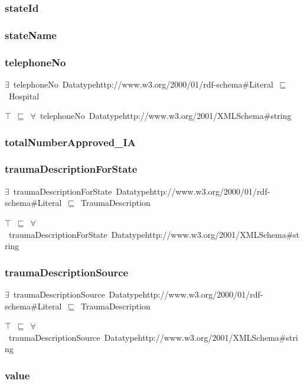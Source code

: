 \documentclass{article}
\begin{document}
\subsubsection*{stateId}

\subsubsection*{stateName}

\subsubsection*{telephoneNo}

\ensuremath{\exists}~telephoneNo~Datatypehttp://www.w3.org/2000/01/rdf-schema#Literal~\ensuremath{\sqsubseteq}~Hospital

\ensuremath{\top}~\ensuremath{\sqsubseteq}~\ensuremath{\forall}~telephoneNo~Datatypehttp://www.w3.org/2001/XMLSchema#string

\subsubsection*{totalNumberApproved\_IA}

\subsubsection*{traumaDescriptionForState}

\ensuremath{\exists}~traumaDescriptionForState~Datatypehttp://www.w3.org/2000/01/rdf-schema#Literal~\ensuremath{\sqsubseteq}~TraumaDescription

\ensuremath{\top}~\ensuremath{\sqsubseteq}~\ensuremath{\forall}~traumaDescriptionForState~Datatypehttp://www.w3.org/2001/XMLSchema#string

\subsubsection*{traumaDescriptionSource}

\ensuremath{\exists}~traumaDescriptionSource~Datatypehttp://www.w3.org/2000/01/rdf-schema#Literal~\ensuremath{\sqsubseteq}~TraumaDescription

\ensuremath{\top}~\ensuremath{\sqsubseteq}~\ensuremath{\forall}~traumaDescriptionSource~Datatypehttp://www.w3.org/2001/XMLSchema#string

\subsubsection*{value}
\end{document}
